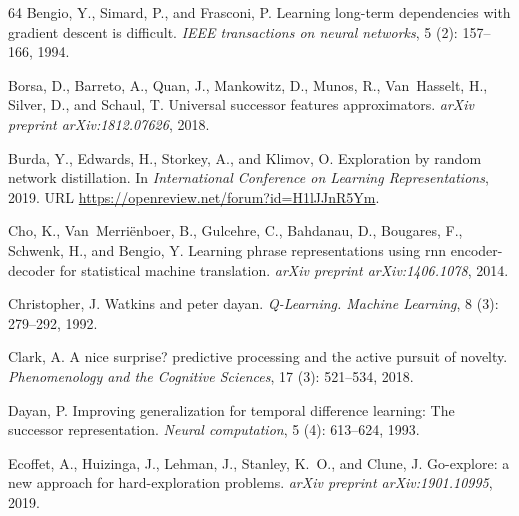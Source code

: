 \documentclass{article}
\theoremstyle{plain}
\theoremstyle{definition}
\theoremstyle{remark}
\begin{document}
\begin{thebibliography}{64}
Bengio, Y., Simard, P., and Frasconi, P.
\newblock Learning long-term dependencies with gradient descent is difficult.
\newblock \emph{IEEE transactions on neural networks}, 5 (2):
  157--166, 1994.

Borsa, D., Barreto, A., Quan, J., Mankowitz, D., Munos, R., Van~Hasselt, H.,
  Silver, D., and Schaul, T.
\newblock Universal successor features approximators.
\newblock \emph{arXiv preprint arXiv:1812.07626}, 2018.

Burda, Y., Edwards, H., Storkey, A., and Klimov, O.
\newblock Exploration by random network distillation.
\newblock In \emph{International Conference on Learning Representations}, 2019.
\newblock URL \url{https://openreview.net/forum?id=H1lJJnR5Ym}.

Cho, K., Van~Merri{\"e}nboer, B., Gulcehre, C., Bahdanau, D., Bougares, F.,
  Schwenk, H., and Bengio, Y.
\newblock Learning phrase representations using rnn encoder-decoder for
  statistical machine translation.
\newblock \emph{arXiv preprint arXiv:1406.1078}, 2014.

Christopher, J.
\newblock Watkins and peter dayan.
\newblock \emph{Q-Learning. Machine Learning}, 8 (3):
  279--292, 1992.

Clark, A.
\newblock A nice surprise? predictive processing and the active pursuit of
  novelty.
\newblock \emph{Phenomenology and the Cognitive Sciences}, 17
  (3): 521--534, 2018.

Dayan, P.
\newblock Improving generalization for temporal difference learning: The
  successor representation.
\newblock \emph{Neural computation}, 5 (4): 613--624, 1993.

Ecoffet, A., Huizinga, J., Lehman, J., Stanley, K.~O., and Clune, J.
\newblock Go-explore: a new approach for hard-exploration problems.
\newblock \emph{arXiv preprint arXiv:1901.10995}, 2019.


\end{thebibliography}
\end{document}
